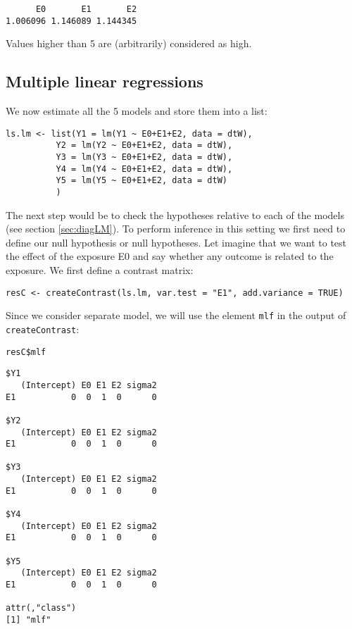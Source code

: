 \documentclass{article}
\begin{document}
\begin{verbatim}
      E0       E1       E2 
1.006096 1.146089 1.144345
\end{verbatim}
Values higher than 5 are (arbitrarily) considered as high.

\subsection{Multiple linear regressions}
\label{sec:orgd0f8d3b}


We now estimate all the 5 models and store them into a list:
\lstset{language=r,label= ,caption= ,captionpos=b,numbers=none}
\begin{lstlisting}
ls.lm <- list(Y1 = lm(Y1 ~ E0+E1+E2, data = dtW),
	      Y2 = lm(Y2 ~ E0+E1+E2, data = dtW),
	      Y3 = lm(Y3 ~ E0+E1+E2, data = dtW),
	      Y4 = lm(Y4 ~ E0+E1+E2, data = dtW),
	      Y5 = lm(Y5 ~ E0+E1+E2, data = dtW)
	      )
\end{lstlisting}

The next step would be to check the hypotheses relative to each of the
models (see section \ref{sec:diagLM}). To perform inference in this setting
we first need to define our null hypothesis or null hypotheses. Let
imagine that we want to test the effect of the exposure E0 and say
whether any outcome is related to the exposure. We first define a
contrast matrix:

\lstset{language=r,label= ,caption= ,captionpos=b,numbers=none}
\begin{lstlisting}
resC <- createContrast(ls.lm, var.test = "E1", add.variance = TRUE)
\end{lstlisting}

Since we consider separate model, we will use the element \texttt{mlf} in the
output of \texttt{createContrast}:
\lstset{language=r,label= ,caption= ,captionpos=b,numbers=none}
\begin{lstlisting}
resC$mlf
\end{lstlisting}
\begin{verbatim}
$Y1
   (Intercept) E0 E1 E2 sigma2
E1           0  0  1  0      0

$Y2
   (Intercept) E0 E1 E2 sigma2
E1           0  0  1  0      0

$Y3
   (Intercept) E0 E1 E2 sigma2
E1           0  0  1  0      0

$Y4
   (Intercept) E0 E1 E2 sigma2
E1           0  0  1  0      0

$Y5
   (Intercept) E0 E1 E2 sigma2
E1           0  0  1  0      0

attr(,"class")
[1] "mlf"
\end{verbatim}
\end{document}
